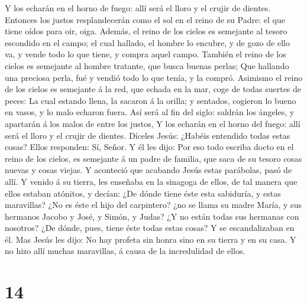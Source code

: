  Y los echarán en el horno de fuego: allí será el lloro y
el crujir de dientes.  Entonces los justos resplandecerán
como el sol en el reino de su Padre: el que tiene oídos para oir, oiga.
 Además, el reino de los cielos es semejante al tesoro
escondido en el campo; el cual hallado, el hombre lo encubre, y de gozo
de ello va, y vende todo lo que tiene, y compra aquel campo.
 También el reino de los cielos es semejante al hombre
tratante, que busca buenas perlas;  Que hallando una
preciosa perla, fué y vendió todo lo que tenía, y la compró.
 Asimismo el reino de los cielos es semejante á la red, que
echada en la mar, coge de todas suertes de peces:  La cual
estando llena, la sacaron á la orilla; y sentados, cogieron lo bueno en
vasos, y lo malo echaron fuera.  Así será al fin del siglo:
saldrán los ángeles, y apartarán á los malos de entre los justos,
 Y los echarán en el horno del fuego: allí será el lloro y
el crujir de dientes.  Díceles Jesús: ¿Habéis entendido
todas estas cosas? Ellos responden: Sí, Señor.  Y él les
dijo: Por eso todo escriba docto en el reino de los cielos, es semejante
á un padre de familia, que saca de su tesoro cosas nuevas y cosas
viejas.  Y aconteció que acabando Jesús estas parábolas,
pasó de allí.  Y venido á su tierra, les enseñaba en la
sinagoga de ellos, de tal manera que ellos estaban atónitos, y decían:
¿De dónde tiene éste esta sabiduría, y estas maravillas? 
¿No es éste el hijo del carpintero? ¿no se llama su madre María, y sus
hermanos Jacobo y José, y Simón, y Judas?  ¿Y no están
todas sus hermanas con nosotros? ¿De dónde, pues, tiene éste todas estas
cosas?  Y se escandalizaban en él. Mas Jesús les dijo: No
hay profeta sin honra sino en su tierra y en su casa.  Y no
hizo allí muchas maravillas, á causa de la incredulidad de ellos.

\hypertarget{section-13}{%
\section{14}\label{section-13}}

